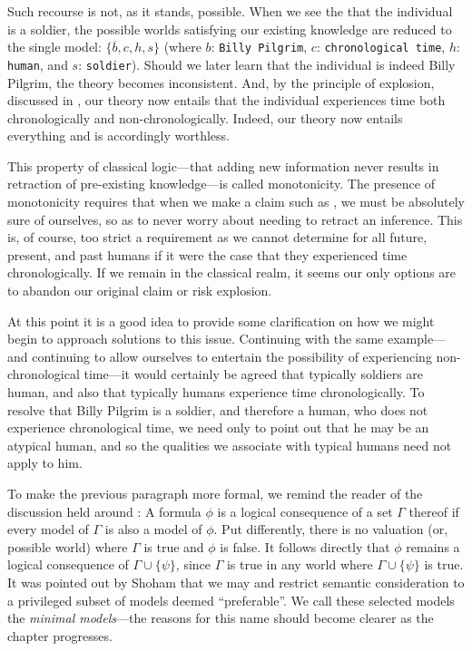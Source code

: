 Such recourse is not, as it stands, possible. When we see the that the individual is a soldier, the possible worlds
satisfying our existing knowledge are reduced to the single model: $\{\overline{b},c,h,s\}$ (where $b$: \texttt{Billy
Pilgrim}, $c$: \texttt{chronological time}, $h$: \texttt{human}, and $s$: \texttt{soldier}). Should we later learn that the
individual is indeed Billy Pilgrim, the theory becomes inconsistent.
And, by the principle of explosion, discussed in , our theory now entails that the
individual experiences time both chronologically and non-chronologically. Indeed, our theory now entails everything and
is accordingly worthless.

This property of classical logic---that adding new information never results in retraction of pre-existing knowledge---is
called monotonicity. The presence of monotonicity requires that when we make a claim such as ,
we must be absolutely sure of ourselves, so as to never worry about needing to retract an inference. This is, of course,
too strict a requirement as we cannot determine for all future, present, and past humans if it were the case that they experienced
time chronologically. If we remain in the classical realm, it seems our only options are to abandon our original claim or
risk explosion.

At this point it is a good idea to provide some clarification on how we might begin to approach solutions to this issue.
Continuing with the same example---and continuing to allow ourselves to entertain the possibility of experiencing non-chronological
time---it would certainly be agreed that typically soldiers are human, and also that typically humans experience time chronologically.
To resolve that Billy Pilgrim is a soldier, and therefore a human, who does not experience chronological time, we need only
to point out that he may be an atypical human, and so the qualities we associate with typical humans need not apply to
him.

To make the previous paragraph more formal, we remind the reader of the discussion held around :
A formula $\phi$ is a logical consequence of a set $\Gamma$ thereof if every model of $\Gamma$ is also a model of $\phi$.
Put differently, there is no valuation (or, possible world) where $\Gamma$ is true and $\phi$ is false. It follows
directly that $\phi$ remains a logical consequence of $\Gamma \cup \{\psi\}$, since $\Gamma$ is true in any world where $\Gamma
\cup \{\psi\}$ is true. It was pointed out by Shoham \cite{shohamSemanticApproach} that we may  and restrict
semantic consideration to a privileged subset of models deemed ``preferable''. We call these selected models the \textit{minimal
models}---the reasons for this name should become clearer as the chapter progresses.


